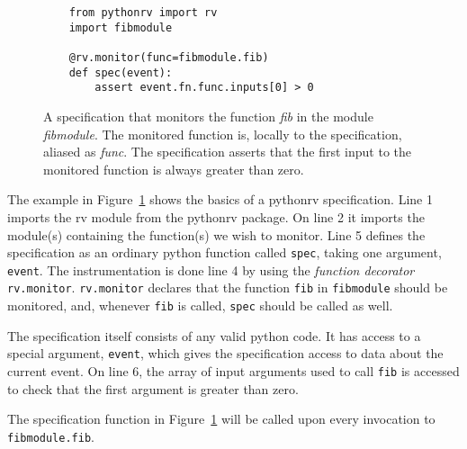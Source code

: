 \documentclass[a4paper,11pt]{kth-mag}
\begin{document}
\begin{figure}[h!]

	\begin{center}
	\begin{minipage}{0.7\textwidth}
	\begin{lstlisting}
	from pythonrv import rv
	import fibmodule

	@rv.monitor(func=fibmodule.fib)
	def spec(event):
		assert event.fn.func.inputs[0] > 0
	\end{lstlisting}
	\end{minipage}
	\end{center}

	\caption{A specification that monitors the function \textit{fib} in the
		module \textit{fibmodule}. The monitored function is, locally to the
		specification, aliased as \textit{func}. The specification asserts that the
		first input to the monitored function is always greater than zero.}
	\label{figure-syntax-example-1}
\end{figure}

The example in Figure~\ref{figure-syntax-example-1} shows the basics of a
pythonrv specification. Line 1 imports the rv module from the pythonrv package.
On line 2 it imports the module(s) containing the function(s) we wish to
monitor. Line 5 defines the specification as an ordinary python function called
\texttt{spec}, taking one argument, \texttt{event}. The instrumentation is done
line 4 by using the \textit{function decorator} \texttt{rv.monitor}.
\texttt{rv.monitor} declares that the function \texttt{fib} in
\texttt{fibmodule} should be monitored, and, whenever \texttt{fib} is called,
\texttt{spec} should be called as well.

The specification itself consists of any valid python code. It has access to a
special argument, \texttt{event}, which gives the specification access to data
about the current event. On line 6, the array of input arguments used to call
\texttt{fib} is accessed to check that the first argument is greater than zero.

The specification function in Figure~\ref{figure-syntax-example-1} will be
called upon every invocation to \texttt{fibmodule.fib}.
\end{document}
